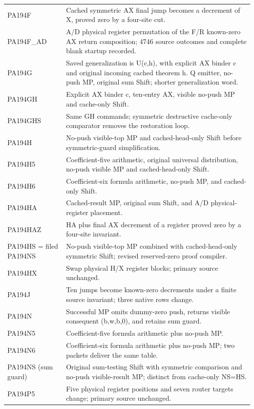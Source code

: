 \begin{longtable}{p{}p{}}
PA194F & Cached symmetric AX final jump becomes a decrement of X, proved zero by a four-site cut. \\
PA194F\_AD & A/D physical register permutation of the F/R known-zero AX return composition; 4746 source outcomes and complete blank startup recorded. \\
PA194G & Saved generalization is U(c,h), with explicit AX binder c and original incoming cached theorem h. Q emitter, no-push MP, original sum Shift; shorter generalization word. \\
PA194GH & Explicit AX binder c, ten-entry AX, visible no-push MP and cache-only Shift. \\
PA194GHS & Same GH commands; symmetric destructive cache-only comparator removes the restoration loop. \\
PA194H & No-push visible-top MP and cached-head-only Shift before symmetric-guard simplification. \\
PA194H5 & Coefficient-five arithmetic, original universal distribution, no-push visible MP and cached-head-only Shift. \\
PA194H6 & Coefficient-six formula arithmetic, no-push MP, and cached-only Shift. \\
PA194HA & Cached-result MP, original sum Shift, and A/D physical-register placement. \\
PA194HAZ & HA plus final AX decrement of a register proved zero by a four-site invariant. \\
PA194HS = filed PA194NS & No-push visible-top MP combined with cached-head-only symmetric Shift; revised reserved-zero proof compiler. \\
PA194HX & Swap physical H/X register blocks; primary source unchanged. \\
PA194J & Ten jumps become known-zero decrements under a finite source invariant; three native rows change. \\
PA194N & Successful MP omits dummy-zero push, returns visible consequent (b,w,b,0), and retains sum guard. \\
PA194N5 & Coefficient-five formula arithmetic plus no-push MP. \\
PA194N6 & Coefficient-six formula arithmetic plus no-push MP; two packets deliver the same table. \\
PA194NS (sum guard) & Original sum-testing Shift with symmetric comparison and no-push visible-result MP; distinct from cache-only NS=HS. \\
PA194P5 & Five physical register positions and seven router targets change; primary source unchanged. \\

\end{longtable}
